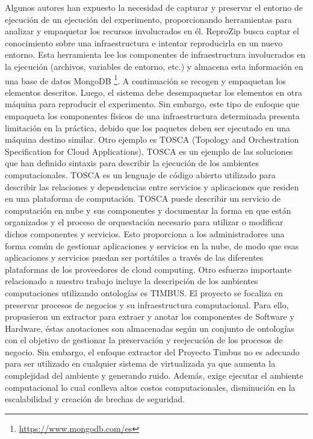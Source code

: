 Algunos autores han expuesto la necesidad de capturar y preservar el entorno de ejecución de un ejecución del experimento, proporcionando herramientas para analizar y empaquetar los recursos involucrados en él.
ReproZip \cite{DBLP:conf/tapp/ChirigatiSF13} busca captar el conocimiento sobre una infraestructura e intentar reproducirla en un nuevo entorno. Esta herramienta lee los componentes de infraestructura involucrados en la ejecución (archivos, variables de entorno, etc.) y almacena esta información en una base de datos MongoDB \footnote{\url{https://www.mongodb.com/es}}. 
A continuación se recogen y empaquetan los elementos descritos. Luego, el sistema debe desempaquetar los elementos  en otra máquina para reproducir el experimento. Sin embargo, este tipo de enfoque que empaqueta los componentes físicos de una infraestructura determinada presenta limitación en la práctica, debido que los paquetes deben ser ejecutado en una máquina destino similar.
Otro ejemplo es TOSCA (Topology and Orchestration Specification for Cloud Applications), TOSCA es un ejemplo de las soluciones que han definido sintaxis para describir la ejecución de los ambientes computacionales. TOSCA es un lenguaje de código abierto utilizado para describir las relaciones y dependencias entre servicios y aplicaciones que residen en una plataforma de computación. TOSCA puede describir un servicio de computación en nube y sus componentes y documentar la forma en que están organizados y el proceso de orquestación necesario para utilizar o modificar dichos componentes y servicios. Esto proporciona a los administradores una forma común de gestionar aplicaciones y servicios en la nube, de modo que esas aplicaciones y servicios puedan ser portátiles a través de las diferentes plataformas de los proveedores de cloud computing. 
Otro esfuerzo importante relacionado a nuestro trabajo incluye la descripción de los ambientes computaciones utilizando ontologías es TIMBUS. El proyecto se focaliza en preservar procesos de negocios y su infraestructura computacional.  Para ello, propusieron un extractor para extraer y anotar los componentes de Software y Hardware, éstas anotaciones son almacenadas según un conjunto de ontologías con el objetivo de gestionar la preservación y reejecución de los procesos de negocio. Sin embargo, el enfoque extractor del Proyecto Timbus no es adecuado para ser utilizado en cualquier sistema de virtualizada ya que aumenta la complejidad del ambiente y generando ruido. Además, exige ejecutar el ambiente computacional lo cual conlleva altos costos computacionales, disminución en la escalabilidad y creación de brechas de seguridad. 

